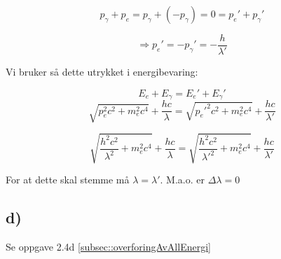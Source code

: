 \documentclass[a4paper,norsk, 10pt]{article}
\begin{document}
$$
p_{\gamma} + p_e = p_{\gamma} + (-p_{\gamma}) = 0 = p_e' + p_{\gamma}'
$$

$$
\Rightarrow p_e' = - p_{\gamma}' = -\frac{h}{\lambda'}
$$

Vi bruker så dette utrykket i energibevaring:

$$
E_e + E_{\gamma} = E_e' + E_{\gamma}'
$$
$$
\sqrt{p_e^2c^2 + m_e^2c^4} + \frac{hc}{\lambda} = \sqrt{p_e'^2c^2 + m_e^2c^4} + \frac{hc}{\lambda'}
$$

$$
\sqrt{\frac{h^2c^2}{\lambda^2} + m_e^2c^4} + \frac{hc}{\lambda} = \sqrt{\frac{h^2c^2}{\lambda'^2} + m_e^2c^4} + \frac{hc}{\lambda'}
$$

For at dette skal stemme må $\lambda = \lambda'$. M.a.o. er $\Delta \lambda = 0$

\subsection*{d)}
Se oppgave 2.4d \ref{subsec::overforingAvAllEnergi}
\end{document}
